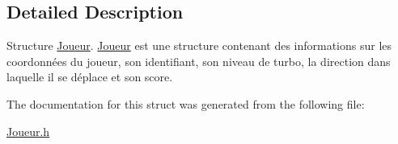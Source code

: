 \subsection{Detailed Description}
Structure \hyperlink{struct_joueur}{Joueur}. \hyperlink{struct_joueur}{Joueur} est une structure contenant des informations sur les coordonnées du joueur, son identifiant, son niveau de turbo, la direction dans laquelle il se déplace et son score. 

The documentation for this struct was generated from the following file\-:\begin{DoxyCompactItemize}
\item 
\hyperlink{_joueur_8h}{Joueur.\-h}\end{DoxyCompactItemize}
